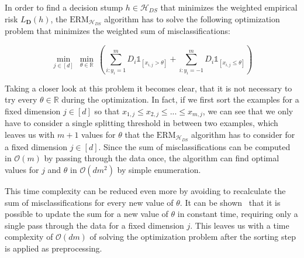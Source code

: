 In order to find a decision stump $h \in \mathcal{H}_{DS}$ that minimizes the weighted empirical risk $L_\mathbf{D}(h)$,
the $\text{ERM}_{\mathcal{H}_{DS}}$ algorithm has to solve
the following optimization problem that minimizes the weighted sum of misclassifications:
\begin{linenomath*}
    $$\min_{j \in \left[ d \right]} \  \min_{\theta \in \mathbb{R}} \ 
        \left( \sum_{i: y_i=1}^m D_i \mathds{1}_{\left[ x_{i, j} > \theta \right]} + 
            \sum_{i: y_i=-1}^m D_i \mathds{1}_{\left[ x_{i, j} \leq \theta \right]} \right)$$
\end{linenomath*}
Taking a closer look at this problem it becomes clear, that it is not necessary to try every $\theta \in \mathbb{R}$
during the optimization.
In fact, if we first sort the examples for a fixed dimension $j \in \left[ d \right]$ so that
$x_{1, j} \leq x_{2, j} \leq ... \leq x_{m, j}$, we can see that we only have to consider a single splitting 
threshold in between two examples, which leaves us with $m+1$ values for $\theta$ that the 
$\text{ERM}_{\mathcal{H}_{DS}}$ algorithm has to consider for a fixed dimension $j \in \left[ d \right]$.
Since the sum of misclassifications can be computed in $\mathcal{O}(m)$ by passing through the data once,
the algorithm can find optimal values for $j$ and $\theta$ in $\mathcal{O}(dm^2)$ by simple enumeration.

This time complexity can be reduced even more by avoiding to recalculate the sum of misclassifications for
every new value of $\theta$. It can be shown~\cite{SSBD14} that it is possible to update the sum for a new
value of $\theta$ in constant time, requiring only a single pass through the data for a fixed dimension $j$.
This leaves us with a time complexity of $\mathcal{O}(dm)$ of solving the optimization problem after the sorting
step is applied as preprocessing.
